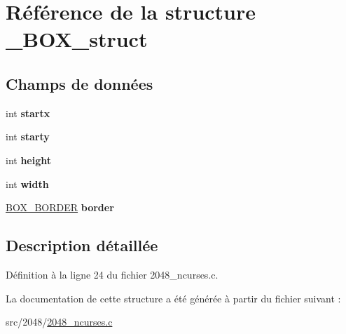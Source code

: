 \hypertarget{struct___b_o_x__struct}{
\section{Référence de la structure \_\-BOX\_\-struct}
\label{struct___b_o_x__struct}
}
\subsection*{Champs de données}
\begin{DoxyCompactItemize}
\item 
\hypertarget{struct___b_o_x__struct_a8f0744c55ee97ebf34757f8499a66139}{
int {\bfseries startx}}
\label{struct___b_o_x__struct_a8f0744c55ee97ebf34757f8499a66139}

\item 
\hypertarget{struct___b_o_x__struct_a19e264821cbd530471c1cf985d7cd239}{
int {\bfseries starty}}
\label{struct___b_o_x__struct_a19e264821cbd530471c1cf985d7cd239}

\item 
\hypertarget{struct___b_o_x__struct_ad12fc34ce789bce6c8a05d8a17138534}{
int {\bfseries height}}
\label{struct___b_o_x__struct_ad12fc34ce789bce6c8a05d8a17138534}

\item 
\hypertarget{struct___b_o_x__struct_a2474a5474cbff19523a51eb1de01cda4}{
int {\bfseries width}}
\label{struct___b_o_x__struct_a2474a5474cbff19523a51eb1de01cda4}

\item 
\hypertarget{struct___b_o_x__struct_ab3803ae87f2e1cf591032aad71a278a3}{
\hyperlink{struct__box__border__struct}{BOX\_\-BORDER} {\bfseries border}}
\label{struct___b_o_x__struct_ab3803ae87f2e1cf591032aad71a278a3}

\end{DoxyCompactItemize}


\subsection{Description détaillée}


Définition à la ligne 24 du fichier 2048\_\-ncurses.c.



La documentation de cette structure a été générée à partir du fichier suivant :\begin{DoxyCompactItemize}
\item 
src/2048/\hyperlink{2048__ncurses_8c}{2048\_\-ncurses.c}\end{DoxyCompactItemize}
